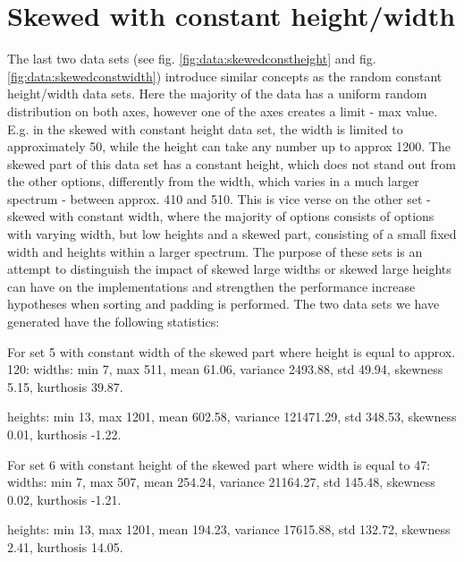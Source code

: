 \section{Skewed with constant height/width}
The last two data sets (see fig. \ref{fig:data:skewedconstheight} and fig. \ref{fig:data:skewedconstwidth}) introduce similar concepts as the random constant height/width data sets. Here the majority of the data has a uniform random distribution on both axes, however one of the axes creates a limit - max value. E.g. in the skewed with constant height data set, the width is limited to approximately 50, while the height can take any number up to approx 1200. The skewed part of this data set has a constant height, which does not stand out from the other options, differently from the width, which varies in a much larger spectrum - between approx. 410 and 510. This is vice verse on the other set - skewed with constant width, where the majority of options consists of options with varying width, but low heights and a skewed part, consisting of a small fixed width and heights within a larger spectrum. The purpose of these sets is an attempt to distinguish the impact of skewed large widths or skewed large heights can have on the implementations and strengthen the performance increase hypotheses when sorting and padding is performed. The two data sets we have generated have the following statistics:

For set 5 with constant width of the skewed part where height is equal to approx. 120:
widths: min 7, max 511, mean 61.06, variance 2493.88, std 49.94,
skewness 5.15, kurthosis 39.87.

heights: min 13, max 1201, mean 602.58, variance 121471.29, std 348.53, skewness 0.01, kurthosis -1.22.

For set 6 with constant height of the skewed part where width is equal to 47:
widths: min 7, max 507, mean 254.24, variance 21164.27, std 145.48, skewness 0.02, kurthosis -1.21.

heights: min 13, max 1201, mean 194.23, variance 17615.88, std 132.72, skewness 2.41, kurthosis 14.05.

